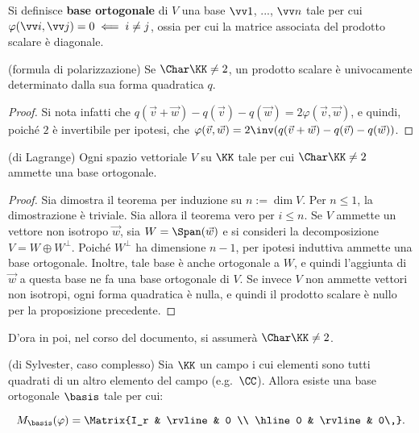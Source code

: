 \documentclass[11pt]{article}
\begin{document}
	\begin{definition}
		Si definisce \textbf{base ortogonale} di $V$ una base $\vv 1$, ..., $\vv n$ tale per cui $\varphi(\vv i, \vv j) = 0
		\impliedby i \neq j$, ossia per cui la matrice associata del prodotto scalare è diagonale. 
	\end{definition}

	\begin{proposition} (formula di polarizzazione)
		Se $\Char \KK \neq 2$, un prodotto scalare è univocamente determinato dalla sua forma quadratica $q$.
	\end{proposition}

	\begin{proof}
		Si nota infatti che $q(\vec v + \vec w) - q(\vec v) - q(\vec w) = 2 \varphi(\vec v, \vec w)$, e quindi,
		poiché $2$ è invertibile per ipotesi, che $\varphi(\vec v, \vec w) = 2\inv (q(\vec v + \vec w) - q(\vec v) - q(\vec w))$.
	\end{proof}

	\begin{theorem}(di Lagrange)
		Ogni spazio vettoriale $V$ su $\KK$ tale per cui $\Char \KK \neq 2$ ammette una base ortogonale.
	\end{theorem}

	\begin{proof}
		Sia dimostra il teorema per induzione su $n := \dim V$. Per $n \leq 1$, la dimostrazione è triviale. Sia
		allora il teorema vero per $i \leq n$. Se $V$ ammette un vettore non isotropo $\vec w$, sia $W = \Span(\vec w)$ e si consideri la decomposizione $V = W \oplus W^\perp$. Poiché $W^\perp$ ha dimensione $n-1$, per ipotesi induttiva
		ammette una base ortogonale. Inoltre, tale base è anche ortogonale a $W$, e quindi l'aggiunta di $\vec w$ a
		questa base ne fa una base ortogonale di $V$. Se invece $V$ non ammette vettori non isotropi, ogni forma quadratica
		è nulla, e quindi il prodotto scalare è nullo per la proposizione precedente.
	\end{proof}


	\begin{note}
		D'ora in poi, nel corso del documento, si assumerà $\Char \KK \neq 2$.
	\end{note}

	\begin{theorem} (di Sylvester, caso complesso)
		Sia $\KK$ un campo i cui elementi sono tutti quadrati di un
		altro elemento del campo (e.g.~$\CC$). Allora esiste una base
		ortogonale $\basis$ tale per cui:
		
		\[ M_\basis(\varphi) = \Matrix{I_r & \rvline & 0 \\ \hline 0 & \rvline & 0\,}. \]
	\end{theorem}
\end{document}
